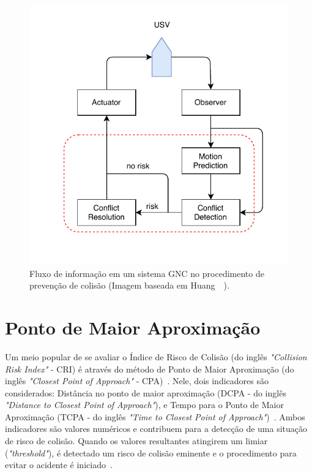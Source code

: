        \begin{figure}[H]
            \centering
            \includegraphics{fig/chap2/fluxo_de_informação.pdf}
            \caption{Fluxo de informação em um sistema GNC no procedimento de prevenção de colisão (Imagem baseada em Huang~\etal~\cite{Huang2020Ship}).}
            \label{fig:Huang2020_collisionAvoidanceProcess}
        \end{figure}
        
    \section{Ponto de Maior Aproximação}\label{subchap2:cpa}
        Um meio popular de se avaliar o Índice de Risco de Colisão (do inglês \textit{"Collision Risk Index"} - CRI) é através do método de Ponto de Maior Aproximação (do inglês \textit{"Closest Point of Approach"} -  CPA)~\cite{Huang2020Ship}. Nele, dois indicadores são considerados: Distância no ponto de maior aproximação (DCPA - do inglês \textit{"Distance to Closest Point of Approach"}), e Tempo para o Ponto de Maior Aproximação (TCPA - do inglês \textit{"Time to Closest Point of Approach"})~\cite{Huang2019Generalized}. Ambos indicadores são valores numéricos e contribuem para a detecção de uma situação de risco de colisão. Quando os valores resultantes atingirem um limiar (\textit{"threshold"}), é detectado um risco de colisão eminente e o procedimento para evitar o acidente é iniciado~\cite{Huang2020Ship}. 
        
